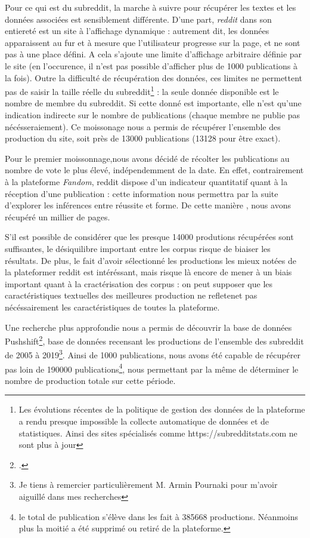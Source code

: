 \documentclass[12pt,a4paper,oneside,titlepage]{book} %
\begin{document}
	Pour ce qui est du subreddit, la marche à suivre pour récupérer les textes et les données associées est sensiblement différente. D'une part, \emph{reddit} dans son entiereté est un site à l'affichage dynamique : autrement dit, les données apparaissent au fur et à mesure que l'utilisateur progresse sur la page, et ne sont pas à une place défini. A cela s'ajoute une limite d'affichage arbitraire définie par le site (en l'occurence, il n'est pas possible d'afficher plus de 1000 publications à la fois). 
	Outre la difficulté de récupération des données, ces limites ne permettent pas de saisir la taille réelle du subreddit\footnote{Les évolutions récentes de la politique de gestion des données de la plateforme a rendu presque impossible la collecte automatique de données et de statistiques. Ainsi des sites spécialisés comme https://subredditstats.com ne sont plus à jour} : la seule donnée disponible est le nombre de membre du subreddit. Si cette donné est importante, elle n'est qu'une indication indirecte sur le nombre de publications (chaque membre ne publie pas nécésseraiement). 
	Ce moissonage nous a permis de récupérer l'ensemble des production du site, soit près de 13000 publications (13128 pour être exact).
		
	Pour le premier moissonnage,nous avons décidé de récolter les publications au nombre de vote le plus élevé, indépendemment de la date. En effet, contrairement à la plateforme \textit{Fandom}, reddit dispose d'un indicateur quantitatif quant à la réception d'une publication : cette information nous permettra par la suite d'explorer les inférences entre réussite et forme.
	De cette manière , nous avons récupéré un millier de pages. 
	
	S'il est possible de considérer que les presque 14000 produtions récupérées sont suffisantes, le désiquilibre important entre les corpus risque de biaiser les résultats. De plus, le fait d'avoir sélectionné les productions les mieux notées de la plateformer reddit est intéréssant, mais risque là encore de mener à un biais important quant à la cractérisation des corpus : on peut supposer que les caractéristiques textuelles des meilleures production ne refletenet pas nécéssairement les caractéristiques de toutes la plateforme.
	
	Une recherche plus approfondie nous a permis de découvrir la base de données Pushshift\footcite{baumgartner_pushshift_2020}, base de données recensant les productions de l'ensemble des subreddit de 2005 à 2019\footnote{Je tiens à remercier particulièrement M. Armin Pournaki pour m'avoir aiguillé dans mes recherches}. Ainsi de 1000 publications, nous avons été capable de récupérer pas loin de 190000 publications\footnote{le total de publication s'élève dans les fait à 385668 productions. Néanmoins plus la moitié a été supprimé ou retiré de la plateforme.}, nous permettant par la même de déterminer le nombre de production totale sur cette période.
	
\end{document}
